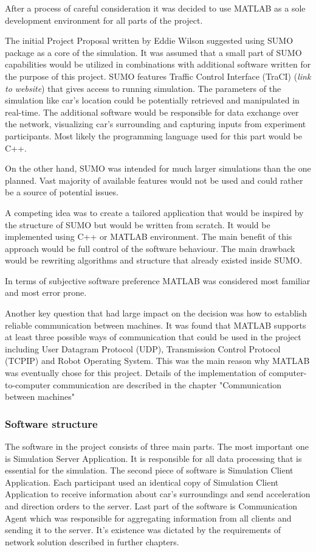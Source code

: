 \documentclass[11pt]{article}
\begin{document}
After a process of careful consideration it was decided to use MATLAB as a sole development environment for all parts of the project. 

The initial Project Proposal written by Eddie Wilson suggested using SUMO package as a core of the simulation. It was assumed that a small part of SUMO capabilities would be utilized in combinations with additional software written for the purpose of this project. SUMO features  Traffic Control Interface (TraCI) (\textit{link to website}) that gives access to running simulation. The parameters of the simulation like car's location could be potentially retrieved and manipulated in real-time. The additional software would be responsible for data exchange over the network, visualizing car's surrounding and capturing inputs from experiment participants. Most likely the programming language used for this part would be C++.


On the other hand, SUMO was intended for much larger simulations than the one planned. Vast majority of available features would not be used and could rather be a source of potential issues. 

A competing idea was to create a tailored application that would be inspired by the structure of SUMO but would be written from scratch. It would be implemented using C++ or MATLAB environment. The main benefit of this approach would be full control of the software behaviour. The main drawback would be rewriting algorithms and structure that already existed inside SUMO. 

In terms of subjective software preference MATLAB was considered most familiar and most error prone.  

Another key question that had large impact on the decision was how to establish reliable communication between machines. 
It was found that MATLAB supports at least three possible ways of communication that could be used in the project including User Datagram Protocol (UDP), Transmission Control Protocol (TCPIP) and Robot Operating System. This was the main reason why MATLAB was eventually chose for this project.
Details of the implementation of computer-to-computer communication are described in the chapter "Communication between machines"

\subsubsection{Software structure}


The software in the project consists of three  main parts. The most important one is Simulation Server Application. It is responsible for all data processing that is essential for the simulation. The second piece of software is Simulation Client Application. Each participant used an identical copy of Simulation Client Application to receive information about car's surroundings and send acceleration and direction orders to the server. Last part of the software is Communication Agent which was responsible for aggregating information from all clients and sending it to the server. It's existence was dictated by the requirements of network solution described in further chapters.
\end{document}
